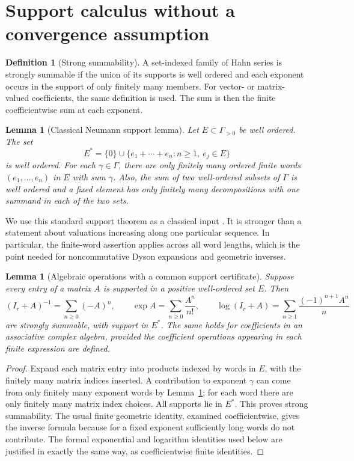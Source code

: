 \documentclass[11pt,letterpaper]{article}
\numberwithin{equation}{section}
\newtheorem{lemma}[theorem]{Lemma}
\theoremstyle{definition}
\newtheorem{definition}[theorem]{Definition}
\theoremstyle{remark}
\begin{document}
\section{Support calculus without a convergence assumption}\label{sec:support}

\begin{definition}[Strong summability]
A set-indexed family of Hahn series is strongly summable if the union of its
supports is well ordered and each exponent occurs in the support of only
finitely many members. For vector- or matrix-valued coefficients, the same
definition is used. The sum is then the finite coefficientwise sum at each
exponent.
\end{definition}

\begin{lemma}[Classical Neumann support lemma]\label{lem:neumann}
Let $E\subset\Gamma_{>0}$ be well ordered. The set
\[
 E^*=\{0\}\cup
 \{e_1+\cdots+e_n:n\geq1,\ e_j\in E\}
\]
is well ordered. For each $\gamma\in\Gamma$, there are only finitely many
ordered finite words $(e_1,\ldots,e_n)$ in $E$ with sum $\gamma$.
Also, the sum of two well-ordered subsets of $\Gamma$ is well ordered and a
fixed element has only finitely many decompositions with one summand in each
of the two sets.
\end{lemma}

We use this standard support theorem as a classical input
\cite{neumann,poonen}. It is stronger than a statement about valuations
increasing along one particular sequence. In particular, the finite-word
assertion applies across all word lengths, which is the point needed for
noncommutative Dyson expansions and geometric inverses.

\begin{lemma}[Algebraic operations with a common support certificate]
\label{lem:operations}
Suppose every entry of a matrix $A$ is supported in a positive well-ordered
set $E$. Then
\[
 (I_r+A)^{-1}=\sum_{n\geq0}(-A)^n,
 \qquad
 \exp A=\sum_{n\geq0}\frac{A^n}{n!},
 \qquad
 \log(I_r+A)=\sum_{n\geq1}\frac{(-1)^{n+1}A^n}{n}
\]
are strongly summable, with support in $E^*$. The same holds for coefficients
in an associative complex algebra, provided the coefficient operations
appearing in each finite expression are defined.
\end{lemma}
\begin{proof}
Expand each matrix entry into products indexed by words in $E$, with the
finitely many matrix indices inserted. A contribution to exponent $\gamma$
can come from only finitely many exponent words by
Lemma~\ref{lem:neumann}; for each word there are only finitely many matrix
index choices. All supports lie in $E^*$. This proves strong summability.
The usual finite geometric identity, examined coefficientwise, gives the
inverse formula because for a fixed exponent sufficiently long words do
not contribute. The formal exponential and logarithm identities used below
are justified in exactly the same way, as coefficientwise finite identities.
\end{proof}
\end{document}
